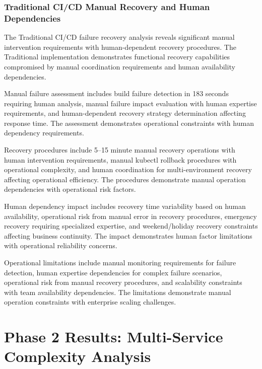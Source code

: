 \subsubsection{Traditional CI/CD Manual Recovery and Human Dependencies}

The Traditional CI/CD failure recovery analysis reveals significant manual intervention requirements with human-dependent recovery procedures. The Traditional implementation demonstrates functional recovery capabilities compromised by manual coordination requirements and human availability dependencies.

Manual failure assessment includes build failure detection in 183 seconds requiring human analysis, manual failure impact evaluation with human expertise requirements, and human-dependent recovery strategy determination affecting response time. The assessment demonstrates operational constraints with human dependency requirements.

Recovery procedures include 5--15 minute manual recovery operations with human intervention requirements, manual kubectl rollback procedures with operational complexity, and human coordination for multi-environment recovery affecting operational efficiency. The procedures demonstrate manual operation dependencies with operational risk factors.

Human dependency impact includes recovery time variability based on human availability, operational risk from manual error in recovery procedures, emergency recovery requiring specialized expertise, and weekend/holiday recovery constraints affecting business continuity. The impact demonstrates human factor limitations with operational reliability concerns.

Operational limitations include manual monitoring requirements for failure detection, human expertise dependencies for complex failure scenarios, operational risk from manual recovery procedures, and scalability constraints with team availability dependencies. The limitations demonstrate manual operation constraints with enterprise scaling challenges.


\section{Phase 2 Results: Multi-Service Complexity Analysis}
\label{sec:phase2_results}

